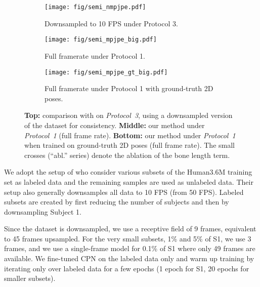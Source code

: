\documentclass[10pt,twocolumn,letterpaper]{article}
\begin{document}
\begin{figure}
    \begin{subfigure}{\linewidth}
    	\centering
        \texttt{[image: fig/semi\_nmpjpe.pdf]}
        \vspace{-6mm}
        \caption{Downsampled to 10 FPS under Protocol 3.}
	    \label{fig:semi_downsampled}
    \end{subfigure}
    \vspace{2mm}
    
    \begin{subfigure}{\linewidth}
    	\centering
    	\texttt{[image: fig/semi\_mpjpe\_big.pdf]}
    	\vspace{-6mm}
    	\caption{Full framerate under Protocol 1.}
    	\label{fig:semi_full}
    \end{subfigure}
	\vspace{2mm}
	
    \begin{subfigure}{\linewidth}
    	\centering
    	\texttt{[image: fig/semi\_mpjpe\_gt\_big.pdf]}
    	\vspace{-6mm}
    	\caption{Full framerate under Protocol 1 with ground-truth 2D poses.}
    	\label{fig:semi_gt}
    \end{subfigure}
    	
	\caption{\textbf{Top:} comparison with \cite{rhodin:unsupervised:2018} on \emph{Protocol~3}, using a downsampled version of the dataset for consistency. 
	\textbf{Middle:} our method under \emph{Protocol~1} (full frame rate). 
	\textbf{Bottom:} our method under \emph{Protocol~1} when trained on ground-truth 2D poses (full frame rate). The small crosses (``abl.'' series) denote the ablation of the bone length term.}
	\label{fig:semi}
	\vspace{-3mm}
\end{figure}

We adopt the setup of \cite{rhodin:unsupervised:2018} who consider various subsets of the Human3.6M training set as labeled data and the remaining samples are used as unlabeled data.
Their setup also generally downsamples all data to 10 FPS (from 50 FPS).
Labeled subsets are created by first reducing the number of subjects and then by downsampling Subject 1.

Since the dataset is downsampled, we use a receptive field of 9 frames, equivalent to 45 frames upsampled. 
For the very small subsets, 1\% and 5\% of S1, we use 3 frames, and we use a single-frame model for 0.1\% of S1 where only 49 frames are available.
We fine-tuned CPN on the labeled data only and warm up training by iterating only over labeled data for a few epochs (1 epoch for  S1, 20 epochs for smaller subsets).
\end{document}
